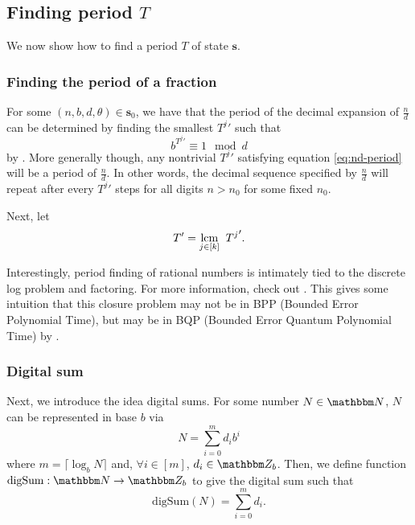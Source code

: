 \documentclass[11pt,titlepage]{article}
\newcommand{\rationalPeriod}{{T^j}'}
\newcommand{\rationalPeriodTotal}{{T}'}
\begin{document}
\subsection{Finding period $T$}
We now show how to find a period $T$ of state $\pmb{s}$.

\subsubsection{Finding the period of a fraction}
For some $(n, b, d, \theta) \in \pmb{s}_0$,
we have that the period of the decimal expansion of $\frac{n}{d}$
can be determined by finding the smallest $\rationalPeriod$ such that
\begin{equation}
\label{eq:nd-period}
b ^ {\rationalPeriod} \equiv 1 \mod d
\end{equation}
by \cite{MathOverflowFracPeriod}.
More generally though, any nontrivial $\rationalPeriod$ satisfying equation \ref{eq:nd-period}
will be a period of $\frac{n}{d}$. In other words, the decimal sequence specified 
by $\frac{n}{d}$ will repeat after every $\rationalPeriod$ steps for all digits 
$n > n_0$ for some fixed $n_0$.

Next, let $$
\rationalPeriodTotal = \lcm{j \in [k]}\; \rationalPeriod.
$$

\begin{remark}[Complexity]
\label{remark:periodcomplex}
  Interestingly, period finding of rational numbers is intimately tied to the discrete
  log problem and factoring. For more information, check out \cite{MathOverflowFracPeriod}.
  This gives some intuition that this closure problem may not be in BPP (Bounded Error Polynomial Time),
  but may be in BQP (Bounded Error Quantum Polynomial Time) by \cite{Shor_1997}.
\end{remark}

\subsubsection{Digital sum}
Next, we introduce the idea digital sums.
For some number $N \in \N$, $N$ can be represented in base $b$ via
\begin{equation}
  N = \sum_{i=0}^{m} d_i b^i
\end{equation}
where $m = \lceil \log_b N \rceil$ and, $\forall i \in [m]$, $d_i \in \Z_b$.
Then, we define function $\mathrm{digSum}: \N \rightarrow \Z_b$
to give the digital sum such that
\begin{equation}
  \mathrm{digSum}(N) = \sum_{i=0}^{m} d_i.
\end{equation}
\end{document}

